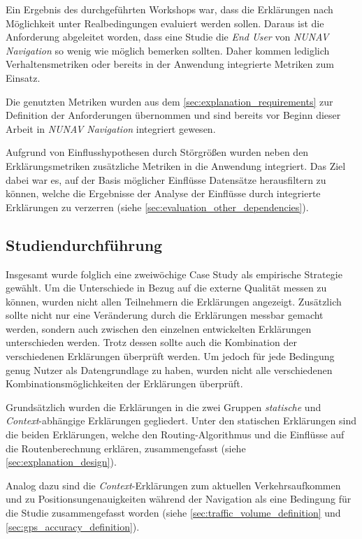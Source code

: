 Ein Ergebnis des durchgeführten Workshops war, dass die Erklärungen nach Möglichkeit unter Realbedingungen evaluiert werden sollen. Daraus ist die Anforderung abgeleitet worden, dass eine Studie die \textit{End User} von \textit{NUNAV Navigation} so wenig wie möglich bemerken sollten. Daher kommen lediglich Verhaltensmetriken oder bereits in der Anwendung integrierte Metriken zum Einsatz.

Die genutzten Metriken wurden aus dem \autoref{sec:explanation_requirements} zur Definition der Anforderungen übernommen und sind bereits vor Beginn dieser Arbeit in \textit{NUNAV Navigation} integriert gewesen.

Aufgrund von Einflusshypothesen durch Störgrößen wurden neben den Erklärungsmetriken zusätzliche Metriken in die Anwendung integriert. Das Ziel dabei war es, auf der Basis möglicher Einflüsse Datensätze herausfiltern zu können, welche die Ergebnisse der Analyse der Einflüsse durch integrierte Erklärungen zu verzerren (siehe \autoref{sec:evaluation_other_dependencies}).

\subsection{Studiendurchführung}

Insgesamt wurde folglich eine zweiwöchige Case Study als empirische Strategie gewählt. Um die Unterschiede in Bezug auf die externe Qualität messen zu können, wurden nicht allen Teilnehmern die Erklärungen angezeigt. Zusätzlich sollte nicht nur eine Veränderung durch die Erklärungen messbar gemacht werden, sondern auch zwischen den einzelnen entwickelten Erklärungen unterschieden werden. Trotz dessen sollte auch die Kombination der verschiedenen Erklärungen überprüft werden. Um jedoch für jede Bedingung genug Nutzer als Datengrundlage zu haben, wurden nicht alle verschiedenen Kombinationsmöglichkeiten der Erklärungen überprüft.

Grundsätzlich wurden die Erklärungen in die zwei Gruppen \textit{statische} und \textit{Context}-abhängige Erklärungen gegliedert. Unter den statischen Erklärungen sind die beiden Erklärungen, welche den Routing-Algorithmus und die Einflüsse auf die Routenberechnung erklären, zusammengefasst (siehe \autoref{sec:explanation_design}).

Analog dazu sind die \textit{Context}-Erklärungen zum aktuellen Verkehrsaufkommen und zu Positionsungenauigkeiten während der Navigation als eine Bedingung für die Studie zusammengefasst worden (siehe \autoref{sec:traffic_volume_definition} und \autoref{sec:gps_accuracy_definition}).

